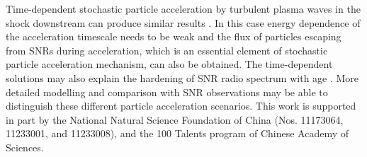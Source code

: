 \documentclass[apj]{emulateapj}
\begin{document}
Time-dependent stochastic particle acceleration by turbulent plasma waves in the shock downstream can produce similar results \citep{2006ApJ...647..539B,2010MNRAS.406.1337F}. In this case energy dependence of the acceleration timescale needs to be weak and the flux of particles escaping from SNRs during acceleration, which is an essential element of stochastic particle acceleration mechanism, can also be obtained. The time-dependent solutions may also explain the hardening of SNR radio spectrum with age \citep{Reynolds2012, 2017ApJ...834..153Z}. More detailed modelling and comparison with SNR observations may be able to distinguish these different particle acceleration scenarios.
\acknowledgments
This work is supported in part by the National Natural Science Foundation
of China (Nos. 11173064, 11233001, and 11233008), and the 100 Talents 
program of Chinese Academy of Sciences.
\end{document}
